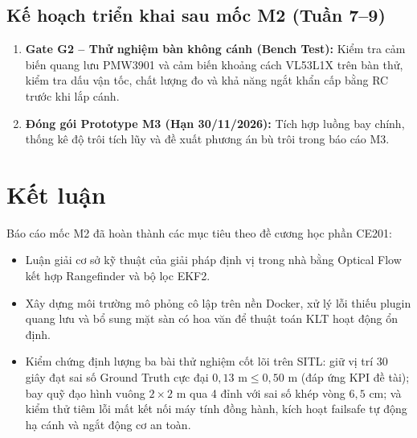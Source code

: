 \documentclass[a4paper,12pt]{article}
\begin{document}
\subsection{Kế hoạch triển khai sau mốc M2 (Tuần 7--9)}
\begin{enumerate}
  \item \textbf{Gate G2 -- Thử nghiệm bàn không cánh (Bench Test):} Kiểm tra cảm biến quang lưu PMW3901 và cảm biến khoảng cách VL53L1X trên bàn thử, kiểm tra dấu vận tốc, chất lượng đo và khả năng ngắt khẩn cấp bằng RC trước khi lắp cánh.
  \item \textbf{Đóng gói Prototype M3 (Hạn 30/11/2026):} Tích hợp luồng bay chính, thống kê độ trôi tích lũy và đề xuất phương án bù trôi trong báo cáo M3.
\end{enumerate}

\section{Kết luận}
Báo cáo mốc M2 đã hoàn thành các mục tiêu theo đề cương học phần CE201:
\begin{itemize}
  \item Luận giải cơ sở kỹ thuật của giải pháp định vị trong nhà bằng Optical Flow kết hợp Rangefinder và bộ lọc EKF2.
  \item Xây dựng môi trường mô phỏng cô lập trên nền Docker, xử lý lỗi thiếu plugin quang lưu và bổ sung mặt sàn có hoa văn để thuật toán KLT hoạt động ổn định.
  \item Kiểm chứng định lượng ba bài thử nghiệm cốt lõi trên SITL: giữ vị trí 30 giây đạt sai số Ground Truth cực đại $0{,}13\text{ m} \le 0{,}50\text{ m}$ (đáp ứng KPI đề tài); bay quỹ đạo hình vuông $2 \times 2\text{ m}$ qua 4 đỉnh với sai số khép vòng $6{,}5\text{ cm}$; và kiểm thử tiêm lỗi mất kết nối máy tính đồng hành, kích hoạt failsafe tự động hạ cánh và ngắt động cơ an toàn.
\end{itemize}
\end{document}
